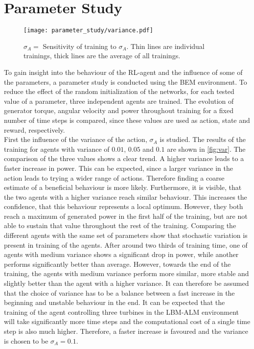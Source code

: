 \section{Parameter Study}
\begin{figure}[ht]
	\centering
	\texttt{[image: parameter\_study/variance.pdf]}
	\caption{$\sigma_A=$ Sensitivity of training to $\sigma_A$. Thin lines are individual trainings, thick lines are the average of all trainings.}
	\label{fig:var}
\end{figure}
To gain insight into the behaviour of the RL-agent and the influence of some of the parameters, a parameter study is conducted using the BEM environment. To reduce the effect of the random initialization of the networks, for each tested value of a parameter, three independent agents are trained. The evolution of generator torque, angular velocity and power throughout training for a fixed number of time steps is compared, since these values are used as action, state and reward, respectively. \\
First the influence of the variance of the action, $\sigma_A$ is studied. The results of the training for agents with variance of $0.01$, $0.05$ and $0.1$ are shown in \autoref{fig:var}. The comparison of the three values shows a clear trend. A higher variance leads to a faster increase in power. 
This can be expected, since a larger variance in the action leads to trying a wider range of actions. Therefore finding a coarse estimate of a beneficial behaviour is more likely. Furthermore, it is visible, that the two agents with a higher variance reach similar behaviour. This increases the confidence, that this behaviour represents a local optimum. However, they both reach a maximum of generated power in the first half of the training, but are not able to sustain that value throughout the rest of the training. Comparing the different agents with the same set of parameters show that stochastic variation is present in training of the agents.  After around two thirds of training time, one of agents with medium variance shows a significant drop in power, while another performs significantly better than average. However, towards the end of the training, the agents with medium variance perform more similar, more stable and slightly better than the agent with a higher variance. It can therefore be assumed that the choice of variance has to be a balance between a fast increase in the beginning and unstable behaviour in the end. It can be expected that the training of the agent controlling three turbines in the LBM-ALM environment will take significantly more time steps and the computational cost of a single time step is also much higher. Therefore, a faster increase is favoured and the variance is chosen to be $\sigma_A = 0.1$. \\
